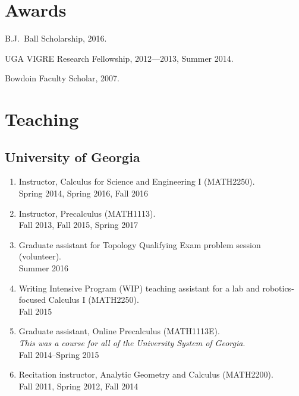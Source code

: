 \documentclass[letterpaper]{article}
\renewenvironment{itemize}{
  \begin{list}{}{
    \setlength{\leftmargin}{1.5em}
  }
}{
  \end{list}
}
\begin{document}
 \section*{Awards}

 \begin{itemize}
 \item B.J.\ Ball Scholarship, 2016.
 \item UGA VIGRE Research Fellowship, 2012---2013, Summer 2014.
 \item Bowdoin Faculty Scholar, 2007.
 \end{itemize}

\section*{Teaching}

\subsection*{University of Georgia}

\begin{enumerate}
\item Instructor, Calculus for Science and Engineering I (MATH2250). \\
  Spring 2014, Spring 2016, Fall 2016
\item Instructor, Precalculus (MATH1113). \\
  Fall 2013, Fall 2015, Spring 2017
\item Graduate assistant for Topology Qualifying Exam problem session
  (volunteer). \\
  Summer 2016
\item Writing Intensive Program (WIP) teaching assistant for a lab and
  robotics-focused Calculus I (MATH2250). \\
  Fall 2015
\item Graduate assistant, Online Precalculus (MATH1113E). \\
  \emph{This was a course for all of the University System of Georgia}.\\
  Fall 2014--Spring 2015
\item Recitation instructor, Analytic Geometry and Calculus
  (MATH2200).\\
  Fall 2011, Spring 2012, Fall 2014

\end{enumerate}
\end{document}
